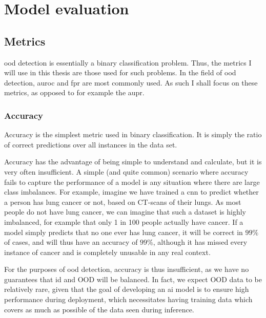\documentclass[UKenglish]{uiomasterthesis} %
\theoremstyle{definition}
\begin{document}
\section{Model evaluation}

\subsection{Metrics}

\ac{ood} detection is essentially a binary classification problem. Thus, the metrics I will use in this thesis are those used for such problems. In the field of \ac{ood} detection, \ac{auroc} and \ac{fpr} are most commonly used. As such I shall focus on these metrics, as opposed to for example the \ac{aupr}.

\subsubsection{Accuracy}

Accuracy is the simplest metric used in binary classification. It is simply the ratio of correct predictions over all instances in the data set. %


Accuracy has the advantage of being simple to understand and calculate, but it is very often insufficient. A simple (and quite common) scenario where accuracy fails to capture the performance of a model is any situation where there are large class imbalances. For example, imagine we have trained a \ac{cnn} to predict whether a person has lung cancer or not, based on CT-scans of their lungs. As most people do not have lung cancer, we can imagine that such a dataset is highly imbalanced, for example that only 1 in 100 people actually have cancer. If a model simply predicts that no one ever has lung cancer, it will be correct in $99\%$ of cases, and will thus have an accuracy of $99\%$, although it has missed every instance of cancer and is completely unusable in any real context.

For the purposes of \ac{ood} detection, accuracy is thus insufficient, as we have no guarantees that \ac{id} and OOD will be balanced. In fact, we expect OOD data to be relatively rare, given that the goal of developing an \ac{ai} model is to ensure high performance during deployment, which necessitates having training data which covers as much as possible of the data seen during inference.
\end{document}
